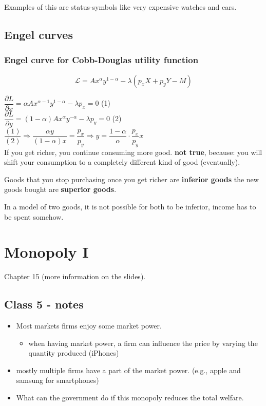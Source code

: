 \documentclass[12pt, a4paper, titlepage]{extarticle}
\begin{document}
	Examples of this are status-symbols like very expensive watches and cars.
	
	\subsection{Engel curves}
	
	\subsubsection{Engel curve for Cobb-Douglas utility function}
	\[ \mathcal{L} = Ax^{\alpha}y^{1-\alpha} - \lambda(p_xX+p_yY - M) \]
	
	
	$\dfrac{\partial L}{\partial x} = \alpha Ax^{\alpha-1}y^{1-\alpha}- \lambda p_x = 0$ (1)\\
	
	$\dfrac{\partial L}{\partial y} = (1-\alpha)Ax^\alpha y^{-\alpha} - \lambda p_y = 0$ (2)\\
	
	$\dfrac{(1)}{(2)} \Rightarrow \dfrac{\alpha y}{(1-\alpha)x}= \dfrac{p_x}{p_y} \Rightarrow y = \dfrac{1-\alpha}{\alpha} \cdot \dfrac{p_x}{p_y}x$\\
	
	If you get richer, you continue consuming more good.
	\textbf{not true}, because: you will shift your consumption to a completely different kind of good (eventually).
	
	Goods that you stop purchasing once you get richer are \textbf{inferior goods} the new goods bought are \textbf{superior goods}.
	
	In a model of two goods, it is not possible for both to be inferior, income has to be spent somehow.
	
	\section{Monopoly I}
	Chapter 15 (more information on the slides).
	
	\subsection{Class 5 - notes}
	\begin{itemize}
	\item Most markets firms enjoy some market power.
	\begin{itemize}
	\item when having market power, a firm can influence the price by varying the quantity produced (iPhones)
	\end{itemize}
	\item mostly multiple firms have a part of the market power. (e.g., apple and samsung for smartphones)
	\item What can the government do if this monopoly reduces the total welfare.
	\end{itemize}
	
\end{document}
